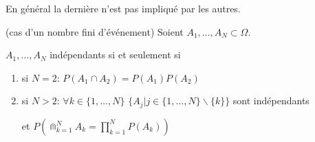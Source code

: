 \documentclass[a4paper, 12pt]{article}
\begin{document}
\begin{remark}
    En général la dernière n'est pas impliqué par les autres.
\end{remark}

\begin{definition}(cas d'un nombre fini d'événement)
    Soient $A_1, \dots, A_N \subset \Omega$.

    $A_1, \dots, A_N$ indépendants si et seulement si
    \begin{enumerate}
        \item si $N = 2$: $P(A_1 \cap A_2) = P(A_1)P(A_2)$
        \item si $N \gt 2$:
            $\forall k \in \{1, \dots, N\}$
            $\{A_j | j \in \{1, \dots, N\}\backslash\{k\}\}$ sont indépendants

            et $P(\Cap_{k=1}^N A_k = \prod_{k=1}^NP(A_k))$
    \end{enumerate}
\end{definition}
\end{document}
